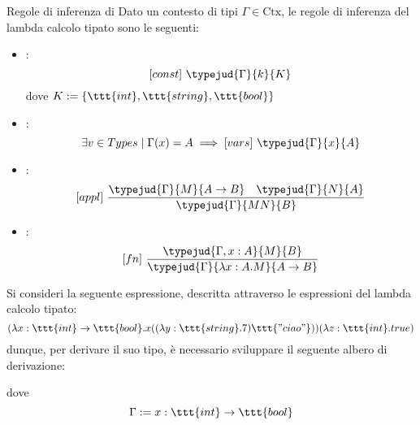 \documentclass[a4paper, 12pt]{report}
\begin{document}
    \begin{framedprop}[label={sys f1 rules}]{Regole di inferenza di }
        Dato un contesto di tipi $\Gamma \in \mathrm{Ctx}$, le regole di inferenza del lambda calcolo tipato sono le seguenti:

        \begin{itemize}
            \item {}: $$[const] \ \typejud{\Gamma}{k}{K}$$ dove $K := \{\ttt{int}, \ttt{string}, \ttt{bool}\}$
            \item {}: $$\exists v \in Types \mid \Gamma(x) = A \implies [vars] \ \typejud{\Gamma}{x}{A}$$
            \item {}: $$[appl] \ \dfrac{\typejud{\Gamma}{M}{A \to B} \quad \typejud{\Gamma}{N}{A}}{\typejud{\Gamma}{MN}{B}}$$
            \item {}: $$[fn] \ \dfrac{\typejud{\Gamma,x:A}{M}{B}}{\typejud{\Gamma}{\lambda x: A.M}{A \to B}}$$
        \end{itemize}
    \end{framedprop}

    \begin{example}
        Si consideri la seguente espressione, descritta attraverso le espressioni del lambda calcolo tipato: $$(\lambda x:\ttt{int}\to \ttt{bool}.x((\lambda y:\ttt{string}.7)\ttt{"ciao"}))(\lambda z: \ttt{int}.true)$$ dunque, per derivare il suo tipo, è necessario sviluppare il seguente albero di derivazione: 

        dove $$\Gamma := x: \ttt{int} \to \ttt{bool}$$
    \end{example}
\end{document}
